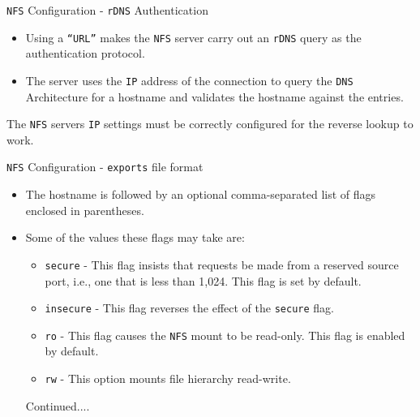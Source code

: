 \documentclass[xcolor=table]{beamer}
\begin{document}
\begin{frame}{\texttt{NFS} Configuration - \texttt{rDNS} Authentication}
  \begin{itemize}
    \item Using a \texttt{``URL''} makes the \texttt{NFS} server carry out an \texttt{rDNS} query as the authentication protocol.
    \item The server uses the \texttt{IP} address of the connection to query the \texttt{DNS} Architecture for a hostname and validates the hostname against the entries.
  \end{itemize}
  \begin{tcolorbox}
    \begin{center}
      \scriptsize The \texttt{NFS} servers \texttt{IP} settings must be correctly configured for the reverse lookup to work.
    \end{center}
  \end{tcolorbox}
\end{frame}

\begin{frame}{\texttt{NFS} Configuration - \texttt{exports} file format}
  \begin{itemize}
    \item The hostname is followed by an optional comma-separated list of flags enclosed in parentheses. 
    \item Some of the values these flags may take are: 
      \begin{itemize}
        \item \texttt{secure} - This flag insists that requests be made from a reserved source port, i.e., one that is less than 1,024. This flag is set by default.
        \item \texttt{insecure} - This flag reverses the effect of the \texttt{secure} flag.
        \item \texttt{ro} - This flag causes the \texttt{NFS} mount to be read-only. This flag is enabled by default.
        \item \texttt{rw} - This option mounts file hierarchy read-write.
      \end{itemize}
      Continued....
  \end{itemize}
\end{frame}
\end{document}
